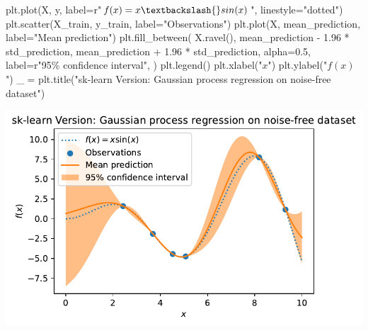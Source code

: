 \documentclass[
  letterpaper,
  DIV=11,
  numbers=noendperiod]{scrreprt}
\newenvironment{Shaded}{\begin{snugshade}}{\end{snugshade}}
\newcommand{\FloatTok}[1]{\textcolor[rgb]{0.68,0.00,0.00}{#1}}
\newcommand{\NormalTok}[1]{\textcolor[rgb]{0.00,0.23,0.31}{#1}}
\newcommand{\OperatorTok}[1]{\textcolor[rgb]{0.37,0.37,0.37}{#1}}
\newcommand{\SpecialCharTok}[1]{\textcolor[rgb]{0.37,0.37,0.37}{#1}}
\newcommand{\StringTok}[1]{\textcolor[rgb]{0.13,0.47,0.30}{#1}}
\newcommand{\VerbatimStringTok}[1]{\textcolor[rgb]{0.13,0.47,0.30}{#1}}
\begin{document}
\begin{Shaded}
\begin{Highlighting}[]
\NormalTok{plt.plot(X, y, label}\OperatorTok{=}\VerbatimStringTok{r"$f(x) = x \textbackslash{}sin(x)$"}\NormalTok{, linestyle}\OperatorTok{=}\StringTok{"dotted"}\NormalTok{)}
\NormalTok{plt.scatter(X\_train, y\_train, label}\OperatorTok{=}\StringTok{"Observations"}\NormalTok{)}
\NormalTok{plt.plot(X, mean\_prediction, label}\OperatorTok{=}\StringTok{"Mean prediction"}\NormalTok{)}
\NormalTok{plt.fill\_between(}
\NormalTok{    X.ravel(),}
\NormalTok{    mean\_prediction }\OperatorTok{{-}} \FloatTok{1.96} \OperatorTok{*}\NormalTok{ std\_prediction,}
\NormalTok{    mean\_prediction }\OperatorTok{+} \FloatTok{1.96} \OperatorTok{*}\NormalTok{ std\_prediction,}
\NormalTok{    alpha}\OperatorTok{=}\FloatTok{0.5}\NormalTok{,}
\NormalTok{    label}\OperatorTok{=}\VerbatimStringTok{r"95}\SpecialCharTok{\% c}\VerbatimStringTok{onfidence interval"}\NormalTok{,}
\NormalTok{)}
\NormalTok{plt.legend()}
\NormalTok{plt.xlabel(}\StringTok{"$x$"}\NormalTok{)}
\NormalTok{plt.ylabel(}\StringTok{"$f(x)$"}\NormalTok{)}
\NormalTok{\_ }\OperatorTok{=}\NormalTok{ plt.title(}\StringTok{"sk{-}learn Version: Gaussian process regression on noise{-}free dataset"}\NormalTok{)}
\end{Highlighting}
\end{Shaded}

\includegraphics{012_num_spot_ei_files/figure-pdf/cell-24-output-1.pdf}
\end{document}
